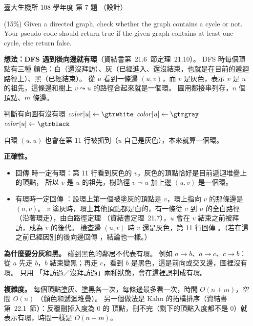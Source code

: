 \begin{pastexam}[label={px:ntu-108-bime-ds-07}]{臺大生機所 108 學年度 第 7 題}
（設計）

(15\%) Given a directed graph, check whether the graph contains a cycle or not. Your pseudo code
should return true if the given graph contains at least one cycle, else return false.
\end{pastexam}

\begin{pastsoln}
\textbf{想法：DFS 遇到後向邊就有環}（資結書第~21.6~節定理~21.10）。 DFS 時每個頂點有三種
顏色：白（還沒拜訪）、灰（已經進入、還沒結束，也就是在目前的遞迴路徑上）、黑（已經結束）。
從 $u$ 看到一條邊 $(u, v)$，而 $v$ 是灰色，表示 $v$ 是 $u$ 的祖先，這條邊和樹上 $v \leadsto u$
的路徑合起來就是一個環。 圖用鄰接串列存，$n$ 個頂點、$m$ 條邊。

\begin{pseudo}{判斷有向圖有沒有環}
        \State $\mathit{color}[u] \gets \gtrwhite$
    \EndFor
     
            \State \Return \TRUE
        \EndIf
    \EndFor
    \State \Return \FALSE
\EndFunction
{} 
    \State $\mathit{color}[u] \gets \gtrgray$
            \State \Return \TRUE {}
        \EndIf
            \State \Return \TRUE
        \EndIf
    \EndFor
    \State $\mathit{color}[u] \gets \gtrblack$
    \State \Return \FALSE
\EndFunction
\end{pseudo}
自環 $(u, u)$ 也會在第 11 行被抓到（$u$ 自己是灰色），本來就算一個環。

\textbf{正確性。}
\begin{itemize}
\item 回傳 \TRUE 時一定有環：第 11 行看到灰色的 $v$，灰色的頂點恰好是目前遞迴堆疊上的頂點，
所以 $v$ 是 $u$ 的祖先，樹路徑 $v \leadsto u$ 加上邊 $(u, v)$ 是一個環。
\item 有環時一定回傳 \TRUE：設環上第一個被塗灰的頂點是 $v$，環上指向 $v$ 的那條邊是 $(u, v)$。
$v$ 塗灰時，環上其他頂點都是白的，有一條從 $v$ 到 $u$ 的全白路徑（沿著環走），由白路徑定理
（資結書定理~21.7），$u$ 會在 $v$ 結束之前被拜訪，成為 $v$ 的後代。 檢查邊 $(u, v)$ 時 $v$
還是灰色，第 11 行回傳 \TRUE。（若在這之前已經因別的後向邊回傳 \TRUE，結論也一樣。）
\end{itemize}

\textbf{為什麼要分灰和黑。} 碰到黑色的鄰居不代表有環。 例如 $a \to b$、$a \to c$、$c \to b$：
從 $a$ 先走 $b$，$b$ 結束變黑；再走 $c$，看到 $b$ 是黑色，這是前向或交叉邊，圖裡沒有環。 只用
「拜訪過／沒拜訪過」兩種狀態，會在這裡誤判成有環。

\textbf{複雜度。} 每個頂點塗灰、塗黑各一次，每條邊最多看一次，時間 $O(n + m)$，空間 $O(n)$
（顏色和遞迴堆疊）。 另一個做法是 Kahn 的拓樸排序（資結書第~22.1~節）：反覆刪掉入度為 $0$ 的
頂點，刪不完（剩下的頂點入度都不是 $0$）就表示有環，時間一樣是 $O(n + m)$。
\end{pastsoln}
